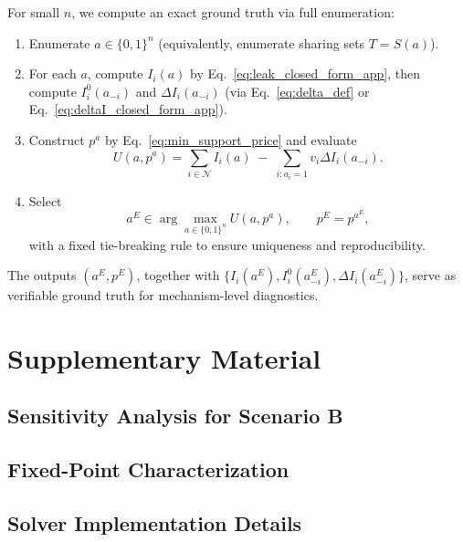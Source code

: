 For small $n$, we compute an exact ground truth via full enumeration:
\begin{enumerate}
\item Enumerate $a\in\{0,1\}^n$ (equivalently, enumerate sharing sets $T=S(a)$).
\item For each $a$, compute $I_i(a)$ by Eq.~\eqref{eq:leak_closed_form_app}, then compute $I_i^{0}(a_{-i})$ and $\Delta I_i(a_{-i})$ (via Eq.~\eqref{eq:delta_def} or Eq.~\eqref{eq:deltaI_closed_form_app}).
\item Construct $p^a$ by Eq.~\eqref{eq:min_support_price} and evaluate
\begin{equation}
U(a,p^a)=\sum_{i\in\mathcal{N}} I_i(a)\;-\;\sum_{i:a_i=1} v_i\Delta I_i(a_{-i}).
\label{eq:implementable_payoff_app}
\end{equation}
\item Select
\begin{equation}
a^{E}\in\arg\max_{a\in\{0,1\}^n} U(a,p^a),
\qquad p^{E}=p^{a^{E}},
\label{eq:eq_selection_app}
\end{equation}
with a fixed tie-breaking rule to ensure uniqueness and reproducibility.
\end{enumerate}

The outputs $(a^{E},p^{E})$, together with $\{I_i(a^{E}),I_i^{0}(a^{E}_{-i}),\Delta I_i(a^{E}_{-i})\}$, serve as verifiable ground truth for mechanism-level diagnostics.

\section{Supplementary Material}

\subsection{Sensitivity Analysis for Scenario B}
\label{app:sensitivity_b}


\subsection{Fixed-Point Characterization}
\label{app:fp_b}


\subsection{Solver Implementation Details}
\label{app:solver}



